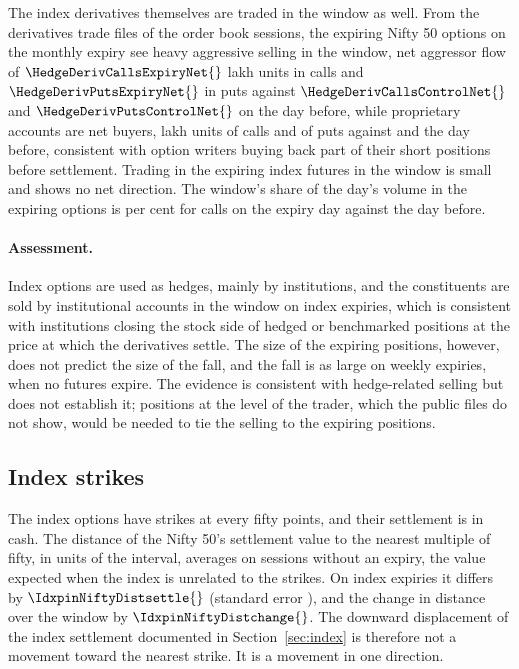 The index derivatives themselves are traded in the window as well. From the derivatives trade
files of the \HedgeDerivSessions{} order book sessions, the expiring Nifty 50 options on the
monthly expiry see heavy aggressive selling in the window, net aggressor flow of
$\HedgeDerivCallsExpiryNet{}$ lakh units in calls and $\HedgeDerivPutsExpiryNet{}$ in puts against
$\HedgeDerivCallsControlNet{}$ and $\HedgeDerivPutsControlNet{}$ on the day before, while
proprietary accounts are net buyers, \HedgeDerivCallsExpiryProp{} lakh units of calls and
\HedgeDerivPutsExpiryProp{} of puts against \HedgeDerivCallsControlProp{} and
\HedgeDerivPutsControlProp{} the day before, consistent with option writers buying back part of
their short positions before settlement. Trading in the expiring index futures in the window is
small and shows no net direction. The window's share of the day's volume in the expiring
options is \HedgeDerivCallsExpiryShare{} per cent for calls on the expiry day against
\HedgeDerivCallsControlShare{} the day before.

\paragraph{Assessment.} Index options are used as hedges, mainly by institutions, and the
constituents are sold by institutional accounts in the window on index expiries, which is
consistent with institutions closing the stock side of hedged or benchmarked positions at the
price at which the derivatives settle. The size of the expiring positions, however, does not
predict the size of the fall, and the fall is as large on weekly expiries, when no futures
expire. The evidence is consistent with hedge-related selling but does not establish it;
positions at the level of the trader, which the public files do not show, would be needed to
tie the selling to the expiring positions.

\subsection{Index strikes}

The index options have strikes at every fifty points, and their settlement is in cash. The
distance of the Nifty 50's settlement value to the nearest multiple of fifty, in units of the
interval, averages \IdxpinNiftyDistsettleNormal{} on sessions without an expiry, the value
expected when the index is unrelated to the strikes. On index expiries it differs by
$\IdxpinNiftyDistsettle{}$ (standard error \IdxpinNiftyDistsettleSe{}), and the change in
distance over the window by $\IdxpinNiftyDistchange{}$. The downward displacement of the index
settlement documented in Section~\ref{sec:index} is therefore not a movement toward the
nearest strike. It is a movement in one direction.
